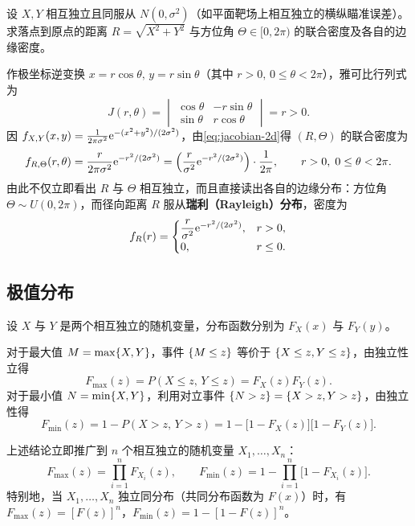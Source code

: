 \begin{example}[title={二维标准正态的极坐标变换（瑞利分布）}]
\label{eg:rayleigh-transform}
设 $X,Y$ 相互独立且同服从 $N(0,\sigma^2)$（如平面靶场上相互独立的横纵瞄准误差）。求落点到原点的距离 $R=\sqrt{X^2+Y^2}$ 与方位角 $\Theta\in[0,2\pi)$ 的联合密度及各自的边缘密度。
\begin{solution}
作极坐标逆变换 $x=r\cos\theta,\,y=r\sin\theta$（其中 $r>0,\,0\le\theta<2\pi$），雅可比行列式为
\[
  J(r,\theta)=
  \begin{vmatrix}
    \cos\theta & -r\sin\theta\\
    \sin\theta & r\cos\theta
  \end{vmatrix}=r>0.
\]
因 $f_{X,Y}(x,y)=\frac{1}{2\pi\sigma^2}\mathrm{e}^{-(x^2+y^2)/(2\sigma^2)}$，由\eqref{eq:jacobian-2d}得 $(R,\Theta)$ 的联合密度为
\[
  f_{R,\Theta}(r,\theta)=\frac{r}{2\pi\sigma^2}\mathrm{e}^{-r^2/(2\sigma^2)}
  =\left(\frac{r}{\sigma^2}\mathrm{e}^{-r^2/(2\sigma^2)}\right)\cdot\frac{1}{2\pi},\qquad r>0,\;0\le\theta<2\pi.
\]
由此不仅立即看出 $R$ 与 $\Theta$ 相互独立，而且直接读出各自的边缘分布：方位角 $\Theta\sim U(0,2\pi)$，而径向距离 $R$ 服从\textbf{瑞利（Rayleigh）分布}，密度为
\[
  f_R(r)=
  \begin{cases}
    \dfrac{r}{\sigma^2}\mathrm{e}^{-r^2/(2\sigma^2)},& r>0,\\
    0,& r\le 0.
  \end{cases}
\]
\end{solution}
\end{example}

\subsection{极值分布}

设 $X$ 与 $Y$ 是两个相互独立的随机变量，分布函数分别为 $F_X(x)$ 与 $F_Y(y)$。

对于最大值 $M=\max\{X,Y\}$，事件 $\{M\le z\}$ 等价于 $\{X\le z,Y\le z\}$，由独立性立得
\begin{equation}
  F_{\max}(z)=P(X\le z,\,Y\le z)=F_X(z)F_Y(z).
  \label{eq:max-cdf}
\end{equation}
对于最小值 $N=\min\{X,Y\}$，利用对立事件 $\{N>z\}=\{X>z,Y>z\}$，由独立性得
\begin{equation}
  F_{\min}(z)=1-P(X>z,\,Y>z)=1-\bigl[1-F_X(z)\bigr]\bigl[1-F_Y(z)\bigr].
  \label{eq:min-cdf}
\end{equation}

上述结论立即推广到 $n$ 个相互独立的随机变量 $X_1,\ldots,X_n$：
\[
  F_{\max}(z)=\prod_{i=1}^{n}F_{X_i}(z),\qquad
  F_{\min}(z)=1-\prod_{i=1}^{n}\bigl[1-F_{X_i}(z)\bigr].
\]
特别地，当 $X_1,\ldots,X_n$ 独立同分布（共同分布函数为 $F(x)$）时，有 $F_{\max}(z)=[F(z)]^n$，$F_{\min}(z)=1-[1-F(z)]^n$。

